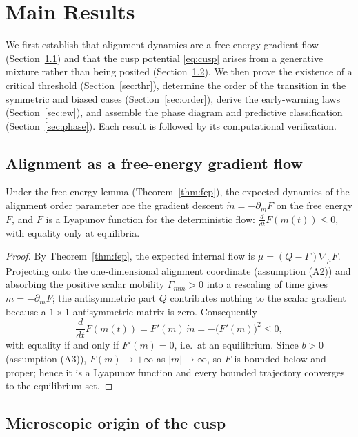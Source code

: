 \section{Main Results}\label{sec:results}

We first establish that alignment dynamics are a free-energy gradient flow
(Section~\ref{sec:gradflow}) and that the cusp potential \eqref{eq:cusp} arises from a
generative mixture rather than being posited (Section~\ref{sec:micro}). We then prove the
existence of a critical threshold (Section~\ref{sec:thr}), determine the order of the
transition in the symmetric and biased cases (Section~\ref{sec:order}), derive the
early-warning laws (Section~\ref{sec:ew}), and assemble the phase diagram and predictive
classification (Section~\ref{sec:phase}). Each result is followed by its computational
verification.

\subsection{Alignment as a free-energy gradient flow}\label{sec:gradflow}

\begin{theorem}\label{thm:gradflow}
Under the free-energy lemma (Theorem~\ref{thm:fep}), the expected dynamics of the alignment
order parameter are the gradient descent $\dot m=-\partial_m F$ on the free energy $F$, and $F$
is a Lyapunov function for the deterministic flow: $\tfrac{d}{dt}F(m(t))\le0$, with equality
only at equilibria.
\end{theorem}

\begin{proof}
By Theorem~\ref{thm:fep}, the expected internal flow is $\dot\mu=(Q-\Gamma)\nabla_\mu F$.
Projecting onto the one-dimensional alignment coordinate (assumption (A2)) and absorbing the
positive scalar mobility $\Gamma_{mm}>0$ into a rescaling of time gives $\dot m=-\partial_m F$;
the antisymmetric part $Q$ contributes nothing to the scalar gradient because a $1\times1$
antisymmetric matrix is zero. Consequently
\[
   \frac{d}{dt}F(m(t))=F'(m)\,\dot m=-\bigl(F'(m)\bigr)^2\le0,
\]
with equality if and only if $F'(m)=0$, i.e.\ at an equilibrium. Since $b>0$ (assumption (A3)),
$F(m)\to+\infty$ as $|m|\to\infty$, so $F$ is bounded below and proper; hence it is a Lyapunov
function and every bounded trajectory converges to the equilibrium set.
\end{proof}

\subsection{Microscopic origin of the cusp}\label{sec:micro}

